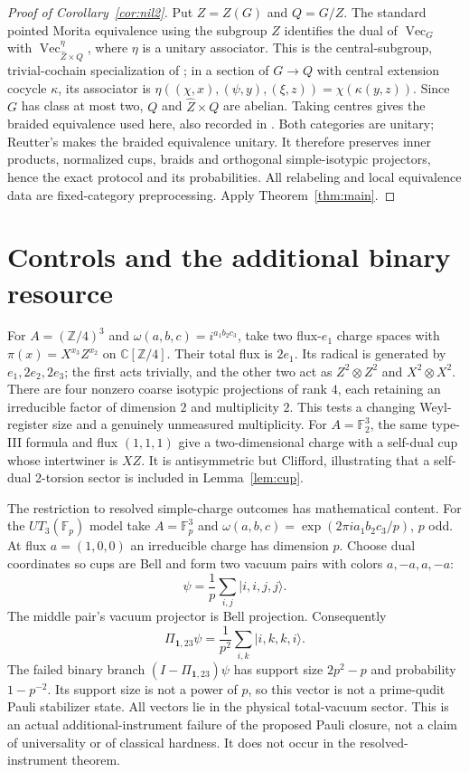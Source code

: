 \documentclass[11pt]{amsart}
\theoremstyle{definition}\newtheorem{definition}[theorem]{Definition}
\newcommand{\C}{\mathbb C}
\newcommand{\one}{\mathbf1}
\newcommand{\VEC}{\operatorname{Vec}}
\begin{document}
\begin{proof}[Proof of Corollary~\ref{cor:nil2}]
Put $Z=Z(G)$ and $Q=G/Z$. The standard pointed Morita equivalence using
the subgroup $Z$ identifies the dual of $\VEC_G$ with
$\VEC_{\widehat Z\times Q}^{\eta}$, where $\eta$ is a unitary associator.
This is the central-subgroup, trivial-cochain specialization of
\cite[Theorems 4.5 and 4.9]{Naidu}; in a section of $G\to Q$ with central
extension cocycle $\kappa$, its associator is
$\eta((\chi,x),(\psi,y),(\xi,z))=\chi(\kappa(y,z))$.
Since $G$ has class at most two, $Q$ and $\widehat Z\times Q$ are abelian.
Taking centres gives the braided equivalence used here, also recorded in
\cite[Theorem D.1]{Fechisin}. Both categories are unitary; Reutter's
\cite[Theorem 5]{Reutter} makes the braided equivalence unitary.
It therefore preserves inner products, normalized cups, braids and orthogonal
simple-isotypic projectors, hence the exact protocol and its probabilities.
All relabeling and local equivalence data are fixed-category preprocessing.
Apply Theorem~\ref{thm:main}.
\end{proof}

\section{Controls and the additional binary resource}
For $A=(\mathbb Z/4)^3$ and $\omega(a,b,c)=i^{a_1b_2c_3}$, take two
flux-$e_1$ charge spaces with $\pi(x)=X^{x_3}Z^{x_2}$ on $\C[\mathbb Z/4]$.
Their total flux is $2e_1$. Its radical is generated by $e_1,2e_2,2e_3$;
the first acts trivially, and the other two act as $Z^2\otimes Z^2$ and
$X^2\otimes X^2$. There are four nonzero coarse isotypic projections of rank
$4$, each retaining an irreducible factor of dimension $2$ and multiplicity $2$.
This tests a changing Weyl-register size and a genuinely unmeasured multiplicity.
For $A=\mathbb F_2^3$, the same type-III formula and flux $(1,1,1)$ give
a two-dimensional charge with a self-dual cup whose intertwiner is $XZ$.
It is antisymmetric but Clifford, illustrating that a self-dual 2-torsion
sector is included in Lemma~\ref{lem:cup}.

The restriction to resolved simple-charge outcomes has mathematical content.
For the $UT_3(\mathbb F_p)$ model take $A=\mathbb F_p^3$ and
$\omega(a,b,c)=\exp(2\pi i a_1b_2c_3/p)$, $p$ odd.
At flux $a=(1,0,0)$ an irreducible charge has dimension $p$.
Choose dual coordinates so cups are Bell and form two vacuum pairs with
colors $a,-a,a,-a$:
\[
 \psi=\frac1p\sum_{i,j}|i,i,j,j\rangle.
\]
The middle pair's vacuum projector is Bell projection. Consequently
\[
 \Pi_{\one,23}\psi=\frac1{p^2}\sum_{i,k}|i,k,k,i\rangle.
\]
The failed binary branch $(I-\Pi_{\one,23})\psi$ has support size
$2p^2-p$ and probability $1-p^{-2}$. Its support size is not a power of $p$,
so this vector is not a prime-qudit Pauli stabilizer state. All vectors lie
in the physical total-vacuum sector. This is an actual additional-instrument
failure of the proposed Pauli closure, not a claim of universality or of
classical hardness. It does not occur in the resolved-instrument theorem.
\end{document}
